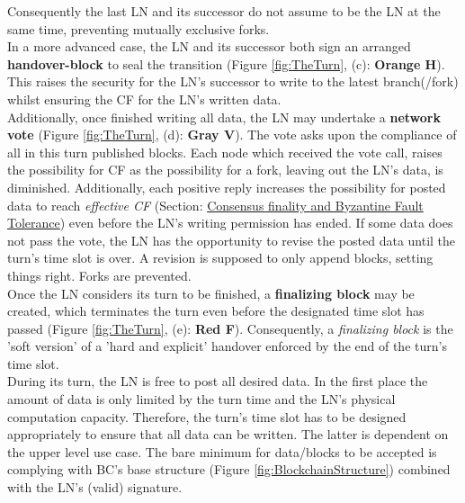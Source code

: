 Consequently the last \gls{LN} and its successor do not assume to be the \gls{LN} at the same time, preventing mutually exclusive forks. \\
In a more advanced case, the \gls{LN} and its successor both sign an arranged \textbf{handover-block} to seal the transition (Figure \ref{fig:TheTurn}, (c): \textbf{Orange H}).
This raises the security for the \gls{LN}'s successor to write to the latest branch(/fork) whilst ensuring the \gls{CF} for the \gls{LN}'s written data. \\
Additionally, once finished writing all data, the \gls{LN} may undertake a \textbf{network vote} (Figure \ref{fig:TheTurn}, (d): \textbf{Gray V}).
The vote asks upon the compliance of all in this turn published blocks.
Each node which received the vote call, raises the possibility for \gls{CF} as the possibility for a fork, leaving out the \gls{LN}'s data, is diminished.
Additionally, each positive reply increases the possibility for posted data to reach \textit{effective \gls{CF}}
(Section: \hyperref[sec:CFandBFT]{Consensus finality and Byzantine Fault Tolerance}) even before the \gls{LN}'s writing permission has ended.
If some data does not pass the vote, the \gls{LN} has the opportunity to revise the posted data until the turn's time slot is over.
A revision is supposed to only append blocks, setting things right.
Forks are prevented. \\
Once the \gls{LN} considers its turn to be finished, a \textbf{finalizing block} may be created,
which terminates the turn even before the designated time slot has passed (Figure \ref{fig:TheTurn}, (e): \textbf{Red F}).
Consequently, a \textit{finalizing block} is the 'soft version' of a 'hard and explicit' handover enforced by the end of the turn's time slot. \\
During its turn, the \gls{LN} is free to post all desired data.
In the first place the amount of data is only limited by the turn time and the \gls{LN}'s physical computation capacity.
Therefore, the turn's time slot has to be designed appropriately to ensure that all data can be written.
The latter is dependent on the upper level use case.
The bare minimum for data/blocks to be accepted is complying with \gls{BC}'s base structure
(Figure \ref{fig:BlockchainStructure}) combined with the \gls{LN}'s (valid) signature.
\begin{figure}
\end{figure}

